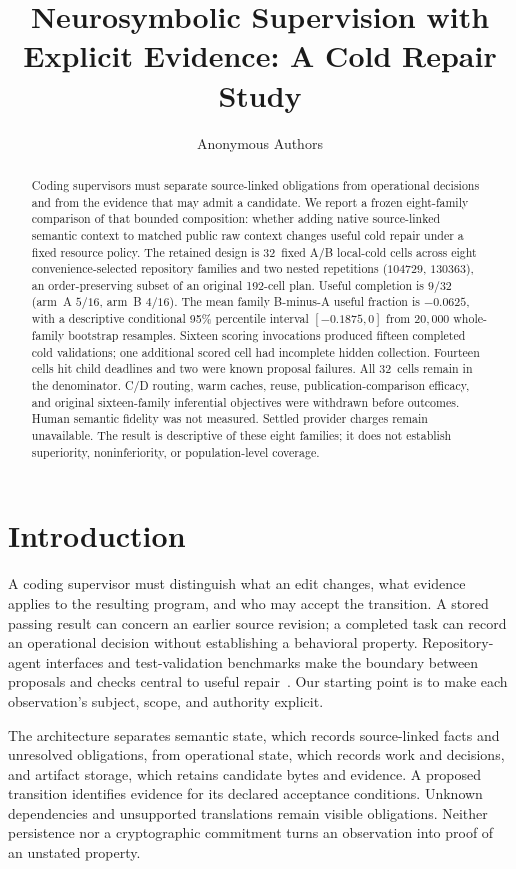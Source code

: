 \documentclass{article}
\title{Neurosymbolic Supervision with Explicit Evidence: A Cold Repair Study}
\author{Anonymous Authors}
\begin{document}
\maketitle
\begin{abstract}
Coding supervisors must separate source-linked obligations from operational
decisions and from the evidence that may admit a candidate. We report a frozen
eight-family comparison of that bounded composition: whether adding native
source-linked semantic context to matched public raw context changes useful
cold repair under a fixed resource policy. The retained design is 32~fixed
A/B local-cold cells across eight convenience-selected repository families
and two nested repetitions ($104729$, $130363$), an order-preserving subset of
an original 192-cell plan. Useful completion is $9/32$ (arm~A $5/16$, arm~B
$4/16$). The mean family B-minus-A useful fraction is $-0.0625$, with a
descriptive conditional 95\% percentile interval $[-0.1875,0]$ from $20{,}000$
whole-family bootstrap resamples. Sixteen scoring invocations produced
fifteen completed cold validations; one additional scored cell had incomplete
hidden collection. Fourteen cells hit child deadlines and two were known
proposal failures. All 32~cells remain in the denominator. C/D routing, warm
caches, reuse, publication-comparison efficacy, and original sixteen-family
inferential objectives were withdrawn before outcomes. Human semantic fidelity
was not measured. Settled provider charges remain unavailable. The result is
descriptive of these eight families; it does not establish superiority,
noninferiority, or population-level coverage.
\end{abstract}

\section{Introduction}
\label{sec:introduction}

A coding supervisor must distinguish what an edit changes, what evidence
applies to the resulting program, and who may accept the transition. A stored
passing result can concern an earlier source revision; a completed task can
record an operational decision without establishing a behavioral property.
Repository-agent interfaces and test-validation benchmarks make the boundary
between proposals and checks central to useful repair~\citep{baseline08,baseline11}.
Our starting point is to make each observation's subject, scope, and authority
explicit.

The architecture separates semantic state, which records source-linked facts
and unresolved obligations, from operational state, which records work and
decisions, and artifact storage, which retains candidate bytes and evidence.
A proposed transition identifies evidence for its declared acceptance
conditions. Unknown dependencies and unsupported translations remain visible
obligations. Neither persistence nor a cryptographic commitment turns an
observation into proof of an unstated property.
\end{document}
